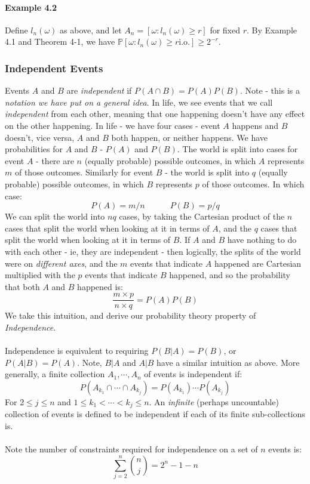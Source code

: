 \documentclass[12pt,a4paper]{article}
\newcommand{\1}[1]{\mathbbm{1}\left\{ #1 \right\}}
\newcommand{\Prob}{\mathbb{P}}
\newcommand{\io}{\text{i.o.}}
\begin{document}
\paragraph{Example 4.2} Define $l_n(\omega)$ as above, and let $A_n = [\omega : l_n(\omega) \geq r]$ for fixed $r$. By Example 4.1 and Theorem 4-1, we have $\Prob\left[\omega: l_n(\omega) \geq r \io\right] \geq 2^{-r}$.

\subsubsection{Independent Events} Events $A$ and $B$ are \textit{independent} if $P(A \cap B) = P(A)P(B)$. Note - this is a \textit{notation we have put on a general idea}. In life, we see events that we call \textit{independent} from each other, meaning that one happening doesn't have any effect on the other happening. In life - we have four cases - event $A$ happens and $B$ doesn't, vice versa, $A$ and $B$ both happen, or neither happens. We have probabilities for $A$ and $B$ - $P(A)$ and $P(B)$. The world is split into cases for event $A$ - there are $n$ (equally probable) possible outcomes, in which $A$ represents $m$ of those outcomes. Similarly for event $B$ - the world is split into $q$ (equally probable) possible outcomes, in which $B$ represents $p$ of those outcomes. In which case:
$$
	P(A) = m/n \quad\quad\quad P(B) = p/q
$$
We can split the world into $nq$ cases, by taking the Cartesian product of the $n$ cases that split the world when looking at it in terms of $A$, and the $q$ cases that split the world when looking at it in terms of $B$. If $A$ and $B$ have nothing to do with each other - ie, they are independent - then logically, the splits of the world were on \textit{different axes}, and the $m$ events that indicate $A$ happened are Cartesian multiplied with the $p$ events that indicate $B$ happened, and so the probability that both $A$ and $B$ happened is:
$$
	\frac{m \times p}{n \times q} = P(A)P(B)
$$
We take this intuition, and derive our probability theory property of \textit{Independence}.
\\\\
Independence is equivalent to requiring $P(B | A) = P(B)$, or $P(A|B) = P(A)$. Note, $B|A$ and $A|B$ have a similar intuition as above. More generally, a finite collection $A_1, \cdots, A_n$ of events is independent if:
$$
	P(A_{k_1} \cap \cdots \cap A_{k_j}) = P(A_{k_1}) \cdots P(A_{k_j})
$$
For $2 \leq j \leq n$ and $1 \leq k_1 < \cdots < k_j \leq n$. An \textit{infinite} (perhaps uncountable) collection of events is defined to be independent if each of its finite sub-collections is.
\\\\
Note the number of constraints required for independence on a set of $n$ events is:
$$
	\sum_{j=2}^n {n \choose j} = 2^n - 1 - n
$$
\end{document}

